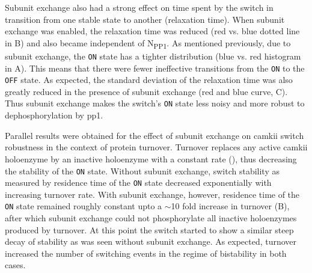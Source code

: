 \documentclass[9pt,lineno,doublespacing]{elife}
\newcommand\SUB[2]{#1\textsubscript{#2}}
\begin{document}
Subunit exchange also had a strong effect on time spent by the switch in
transition from one stable state to another (relaxation time). When subunit
exchange was enabled, the relaxation time was reduced (red vs. blue dotted line
in B) and also became independent of \SUB{N}{PP1}. As
mentioned previously, due to subunit exchange, the \texttt{ON} state has a
tighter distribution (blue vs. red histogram in A). This
means that there were fewer ineffective transitions from the \texttt{ON} to the
\texttt{OFF} state. As expected, the standard deviation of the relaxation time
was also greatly reduced in the presence of subunit exchange (red and blue
curve, C). Thus subunit exchange makes the switch's
\texttt{ON} state less noisy and more robust to dephosphorylation by \gls{pp1}.

Parallel results were obtained for the effect of subunit exchange on
\gls{camkii} switch robustness in the context of protein turnover. Turnover
replaces any active \gls{camkii} holoenzyme by an inactive holoenzyme with a
constant rate (), thus decreasing the stability of the \texttt{ON}
state. Without subunit exchange, switch stability as measured by residence time
of the \texttt{ON} state decreased exponentially with increasing turnover rate.
With subunit exchange, however, residence time of the \texttt{ON} state remained
roughly constant upto a $\sim$10 fold increase in turnover (B),
after which subunit exchange could not phosphorylate all inactive holoenzymes
produced by turnover. At this point the switch started to show a similar steep
decay of stability as was seen without subunit exchange. As expected, turnover
increased the number of switching events in the regime of bistability in both
cases.
\end{document}
